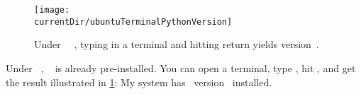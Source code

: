 %
%
\begin{figure}%
\centering%
\texttt{[image: \\currentDir/ubuntuTerminalPythonVersion]}%
\caption{Under \ubuntu\ \linux~, typing  in a \gls{terminal} and hitting return yields version~.}%
\label{fig:ubuntuTerminalPythonVersion}%
\end{figure}%
%
Under \ubuntu\ \linux, \python~ is already pre-installed.
You can open a \gls{terminal}, type , hit \keys{\return}, and get the result illustrated in \cref{fig:ubuntuTerminalPythonVersion}:%
My system has \python\ version~ installed.%
%
\endhsection%
%
